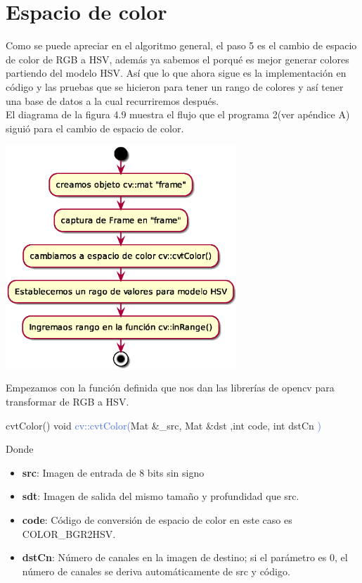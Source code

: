 \section{Espacio de color}
Como se puede apreciar en el algoritmo general, el paso 5 es el cambio de espacio de color
de RGB a HSV, además ya sabemos el porqué es mejor generar colores partiendo del
modelo HSV. Así que lo que ahora sigue es la implementación en código y las pruebas
que se hicieron para tener un rango de colores y así tener una base de datos a la
cual recurriremos después.\\
El diagrama de la figura 4.9 muestra el flujo que el programa 2(ver apéndice A) siguió para
el cambio de espacio de color.
\begin{center}
	\includegraphics[width=0.65\textwidth]{Contenido/Cuerpo/Capitulo4/color.eps}
	\label{color}
\end{center}
Empezamos con la función definida que nos dan las librerías de opencv para transformar
de RGB a HSV.
\begin{example}[label={ex:serie}]{cvtColor()}
	\textcolor{Mulberry}{void} \textcolor{RoyalBlue}{cv::cvtColor(}\textcolor{BurntOrange}{Mat}
	\textcolor{Mulberry}{\&}\textcolor{Bittersweet}{\_src}, \textcolor{BurntOrange}{Mat} \textcolor{Mulberry}{\&}\textcolor{Bittersweet}{dst}
	,\textcolor{Mulberry}{int} \textcolor{Bittersweet}{code}, \textcolor{Mulberry}{int} \textcolor{Bittersweet}{dstCn}
	\textcolor{RoyalBlue}{)}
\end{example}
Donde
\begin{itemize}
	\item \textbf{src}: Imagen de entrada de 8 bits sin signo
	\item \textbf{sdt}: Imagen de salida del mismo tamaño y profundidad que src.
	\item \textbf{code}: Código de conversión de espacio de color en este caso es \\COLOR\_BGR2HSV.
	\item \textbf{dstCn}: Número de canales en la imagen de destino; si el parámetro es 0, el
	      número de canales se deriva automáticamente de src y código.
\end{itemize}
